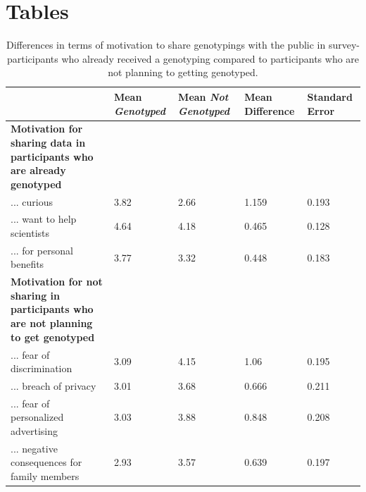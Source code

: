 \documentclass[10pt]{article}
\begin{document}
\section*{Tables}
\begin{table}
\caption{Differences in terms of motivation to share genotypings with the public in survey-participants who already received a genotyping compared to participants who are not planning to getting genotyped. }  
\begin{tabular}{|p{7cm}|p{2cm}|p{2cm}|p{2cm}|p{2cm}|}
\hline
& Mean \emph{Genotyped} & Mean \emph{Not Genotyped} & Mean Difference & Standard Error\\ 
\hline
\textbf{Motivation for sharing data in participants who are already genotyped} & & & & \\
\hline 
... curious & 3.82 & 2.66 & 1.159 & 0.193 \\ \hline %
... want to help scientists & 4.64 & 4.18  & 0.465 & 0.128 \\ \hline %
... for personal benefits & 3.77 & 3.32  & 0.448 & 0.183 \\ \hline %
\textbf{Motivation for not sharing in participants who are not planning to get genotyped} & & & & \\ \hline
... fear of discrimination & 3.09 & 4.15  & 1.06 & 0.195 \\ \hline %
... breach of privacy & 3.01 & 3.68  & 0.666 & 0.211 \\ \hline %
... fear of personalized advertising & 3.03 & 3.88  & 0.848 & 0.208 \\ \hline %
... negative consequences for family members & 2.93 & 3.57  & 0.639 & 0.197 \\ \hline 
\end{tabular}
\label{tab:motivations1}
\end{table}
\end{document}
